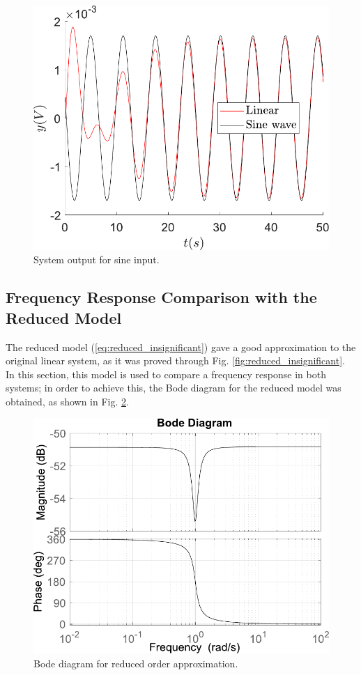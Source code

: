 \begin{figure}[H]
    \centering
    \includegraphics[scale=0.5]{figs/sineOutput/Entrada_seno_lineal_comparacion_bode.pdf}
    \caption{System output for sine input.}
    \label{fig:bode_sineOutput}
\end{figure}

\subsection{Frequency Response Comparison with the Reduced Model}
The reduced model (\ref{eq:reduced_insignificant}) gave a good approximation to the original linear system, as it was proved through Fig. \ref{fig:reduced_insignificant}. In this section, this model is used to compare a frequency response in both systems; in order to achieve this, the Bode diagram for the reduced model was obtained, as shown in Fig. \ref{fig:bode_reducido}. 
\begin{figure}[H]
    \centering
    \includegraphics[scale=.5]{figs/sineOutput/Bode_reducido.pdf}
    \caption{Bode diagram for reduced order approximation.}
    \label{fig:bode_reducido}
\end{figure}


